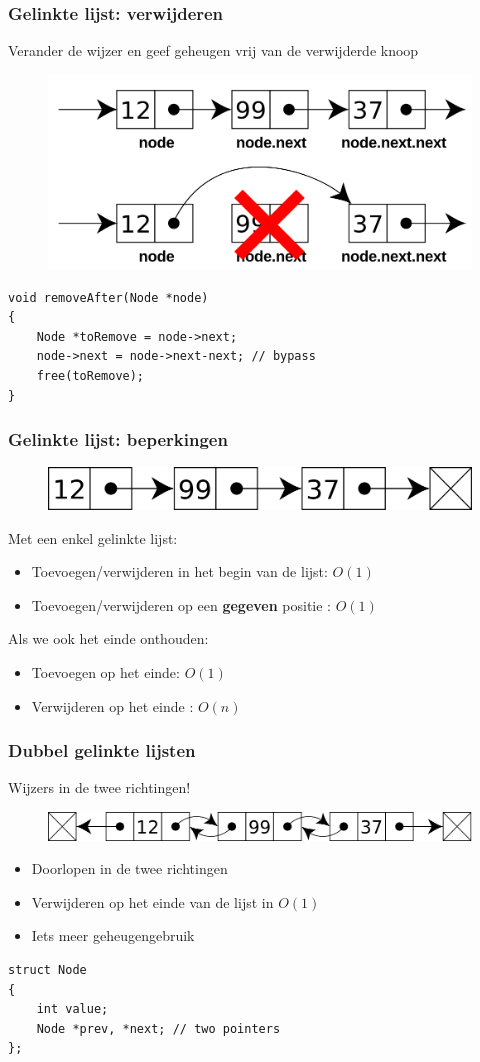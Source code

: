 \documentclass[12pt]{beamer}
\begin{document}
\begin{frame}[fragile]
\frametitle{Gelinkte lijst: verwijderen}
Verander de wijzer en geef geheugen vrij van de verwijderde knoop
\begin{figure}
\centering
\includegraphics[width=.6\textwidth]{img/remove-node}
\end{figure}
\begin{lstlisting}
void removeAfter(Node *node)
{
    Node *toRemove = node->next;
    node->next = node->next-next; // bypass
    free(toRemove);
}
\end{lstlisting}
\end{frame}

\begin{frame}[fragile]
\frametitle{Gelinkte lijst: beperkingen}
\begin{figure}
\centering
\includegraphics[width=.8\textwidth]{img/singly-linked}
\end{figure}
Met een enkel gelinkte lijst:
\begin{itemize}
\item Toevoegen/verwijderen in het begin van de lijst: $O(1)$
\item Toevoegen/verwijderen op een \textbf{gegeven} positie : $O(1)$
\end{itemize}
Als we ook het einde onthouden:
\begin{itemize}
\item Toevoegen op het einde: $O(1)$
\item Verwijderen op het einde : $O(n)$
\end{itemize}
\end{frame}

\begin{frame}[fragile]
\frametitle{Dubbel gelinkte lijsten}
Wijzers in de twee richtingen!
\begin{figure}
\centering
\includegraphics[width=.8\textwidth]{img/doubly-linked}
\end{figure}
\begin{itemize}
\item Doorlopen in de twee richtingen
\item Verwijderen op het einde van de lijst in $O(1)$
\item Iets meer geheugengebruik
\end{itemize}
\begin{lstlisting}
struct Node
{
    int value;
    Node *prev, *next; // two pointers
};
\end{lstlisting}
\end{frame}
\end{document}
